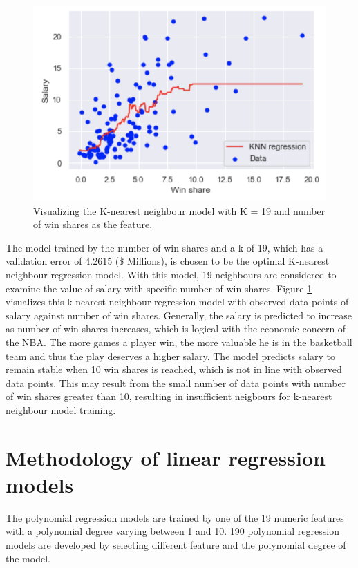 \documentclass[letterpaper,12pt,twoside,]{pinp}
\begin{document}
\begin{figure}
\includegraphics[width=1\linewidth]{knn_plot.png}
\centering
\caption{Visualizing the K-nearest neighbour model with K = 19 and number of win shares as the feature.}
\label{fig:knn}
\end{figure}

The model trained by the number of win shares and a k of 19, which has a
validation error of 4.2615 (\$ Millions), is chosen to be the optimal
K-nearest neighbour regression model. With this model, 19 neighbours are
considered to examine the value of salary with specific number of win
shares. Figure \ref{fig:knn} visualizes this k-nearest neighbour
regression model with observed data points of salary against number of
win shares. Generally, the salary is predicted to increase as number of
win shares increases, which is logical with the economic concern of the
NBA. The more games a player win, the more valuable he is in the
basketball team and thus the play deserves a higher salary. The model
predicts salary to remain stable when 10 win shares is reached, which is
not in line with observed data points. This may result from the small
number of data points with number of win shares greater than 10,
resulting in insufficient neigbours for k-nearest neighbour model
training.

\hypertarget{methodology-of-linear-regression-models}{%
\section{Methodology of linear regression
models}\label{methodology-of-linear-regression-models}}

The polynomial regression models are trained by one of the 19 numeric
features with a polynomial degree varying between 1 and 10. 190
polynomial regression models are developed by selecting different
feature and the polynomial degree of the model.
\end{document}
